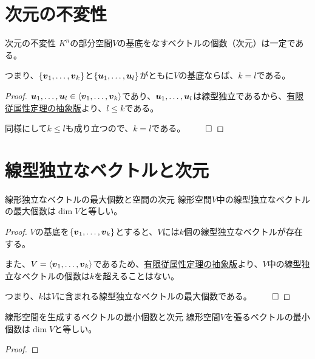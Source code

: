 \documentclass[../../../topic_linear-algebra]{subfiles}
\begin{document}
\sectionline
\section{次元の不変性}

\begin{theorem*}{次元の不変性}
  $K^n$の部分空間$V$の基底をなすベクトルの個数（次元）は一定である。

  つまり、$\{ \vb*{v}_1, \dots, \vb*{v}_k \}$と$\{ \vb*{u}_1, \dots, \vb*{u}_l \}$がともに$V$の基底ならば、$k = l$である。
\end{theorem*}

\begin{proof}
  $\vb*{u}_1, \dots, \vb*{u}_l \in \langle \vb*{v}_1, \dots, \vb*{v}_k \rangle$であり、$\vb*{u}_1, \dots, \vb*{u}_l$は線型独立であるから、\hyperref[thm:abstract-finite-dependency]{有限従属性定理の抽象版}より、$l \leq k$である。

  同様にして$k \leq l$も成り立つので、$k = l$である。 $\qed$
\end{proof}

\sectionline
\section{線型独立なベクトルと次元}

\begin{theorem*}{線形独立なベクトルの最大個数と空間の次元}
  線形空間$V$中の線型独立なベクトルの最大個数は$\dim V$と等しい。
\end{theorem*}

\begin{proof}
  $V$の基底を$\{ \vb*{v}_1,\dots, \vb*{v}_k \}$とすると、$V$には$k$個の線型独立なベクトルが存在する。

  また、$V = \langle \vb*{v}_1, \dots, \vb*{v}_k \rangle$であるため、\hyperref[thm:abstract-finite-dependency]{有限従属性定理の抽象版}より、$V$中の線型独立なベクトルの個数は$k$を超えることはない。

  つまり、$k$は$V$に含まれる線型独立なベクトルの最大個数である。 $\qed$
\end{proof}

\sectionline

\begin{theorem*}{線形空間を生成するベクトルの最小個数と次元}
  線形空間$V$を張るベクトルの最小個数は$\dim V$と等しい。
\end{theorem*}

\begin{proof}
\end{proof}
\end{document}
